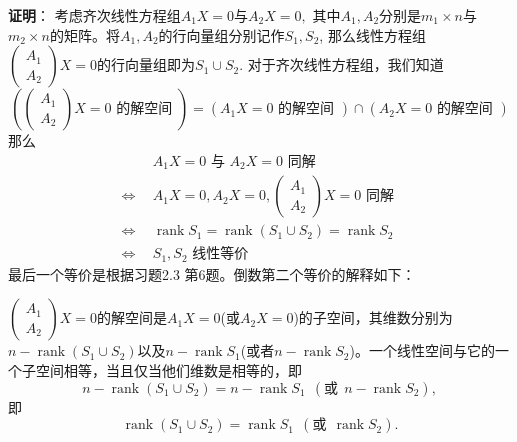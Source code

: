 {\bf 证明}： 考虑齐次线性方程组$A_1X = 0$与$A_2X = 0,$ 其中$A_1, A_2$分别是$m_1\times n$与$m_2\times n$的矩阵。将$A_1, A_2$的行向量组分别记作$S_1, S_2$, 那么线性方程组$\begin{pmatrix}A_1 \\ A_2\end{pmatrix} X = 0$的行向量组即为$S_1 \cup S_2$. 对于齐次线性方程组，我们知道
$$\left( \begin{pmatrix}A_1 \\ A_2\end{pmatrix} X = 0 \text{ 的解空间 } \right) = \left( A_1 X = 0 \text{ 的解空间 } \right) \cap \left( A_2X = 0 \text{ 的解空间 } \right)$$
那么
\begin{align*}
& ~~ A_1X = 0 \text{ 与 } A_2X = 0 \text{ 同解 } \\
\Longleftrightarrow & ~~ A_1X = 0, A_2X = 0, \begin{pmatrix}A_1 \\ A_2\end{pmatrix} X = 0 \text{ 同解 } \\
\Longleftrightarrow & ~~ \operatorname{rank} S_1 = \operatorname{rank} (S_1 \cup S_2) = \operatorname{rank} S_2 \\
\Longleftrightarrow & ~~ S_1, S_2 \text{ 线性等价 }
\end{align*}
最后一个等价是根据习题2.3 第6题。倒数第二个等价的解释如下：

$\begin{pmatrix}A_1 \\ A_2\end{pmatrix} X = 0$的解空间是$A_1X = 0$(或$A_2X = 0$)的子空间，其维数分别为$n - \operatorname{rank} (S_1\cup S_2)$以及$n - \operatorname{rank} S_1$(或者$n - \operatorname{rank} S_2$)。一个线性空间与它的一个子空间相等，当且仅当他们维数是相等的，即
$$n - \operatorname{rank} (S_1\cup S_2) = n - \operatorname{rank} S_1 ~~ (\text{或} ~~ n - \operatorname{rank} S_2),$$
即
$$\operatorname{rank} (S_1\cup S_2) = \operatorname{rank} S_1 ~~ (\text{或} ~~ \operatorname{rank} S_2).$$


